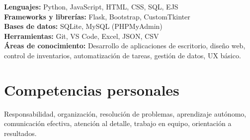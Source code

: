 \documentclass[11pt]{article}
\begin{document}
\textbf{Lenguajes:} Python, JavaScript, HTML, CSS, SQL, EJS \\
\textbf{Frameworks y librerías:} Flask, Bootstrap, CustomTkinter \\
\textbf{Bases de datos:} SQLite, MySQL (PHPMyAdmin) \\
\textbf{Herramientas:} Git, VS Code, Excel, JSON, CSV \\
\textbf{Áreas de conocimiento:} Desarrollo de aplicaciones de escritorio, diseño web, control de inventarios, automatización de tareas, gestión de datos, UX básico.

\vspace{6pt}

\section*{Competencias personales}

Responsabilidad, organización, resolución de problemas, aprendizaje autónomo, comunicación efectiva, atención al detalle, trabajo en equipo, orientación a resultados.
\end{document}
